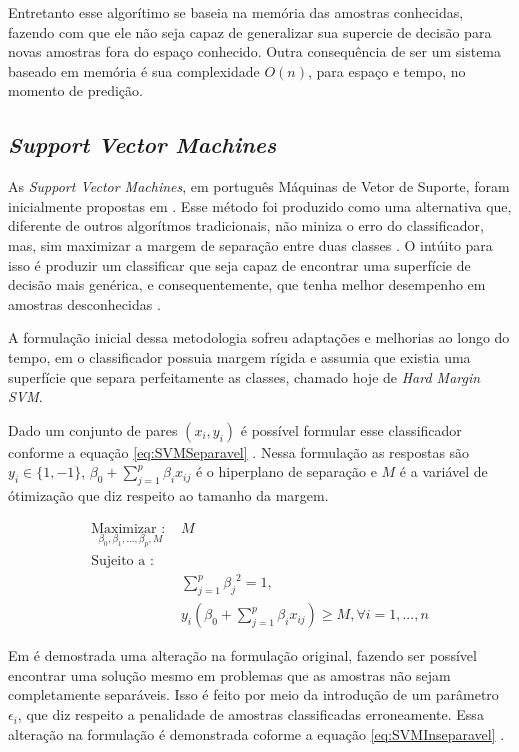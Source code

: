 Entretanto esse algorítimo se baseia na memória das amostras conhecidas, fazendo com que ele não seja capaz de generalizar sua supercie de decisão para novas amostras fora do espaço conhecido. Outra consequência de ser um sistema baseado em memória é sua complexidade $O(n)$, para espaço e tempo, no momento de predição. 


\subsection{\textit{Support Vector Machines}}
As \textit{Support Vector Machines}, em português Máquinas de Vetor de Suporte, foram inicialmente propostas em . Esse método foi produzido como uma alternativa que, diferente de outros algorítmos tradicionais, não miniza o erro do classificador, mas, sim maximizar a margem de separação entre duas classes \cite{James20131}. O intúito para isso é produzir um classificar que seja capaz de encontrar uma superfície de decisão mais genérica, e consequentemente, que tenha melhor desempenho em amostras desconhecidas \cite{Cortes1995}.

A formulação inicial dessa metodologia sofreu adaptações e melhorias ao longo do tempo, em  o classificador possuia margem rígida e assumia que existia uma superfície que separa perfeitamente as classes, chamado hoje de \textit{Hard Margin SVM}.

Dado um conjunto de pares $(x_i, y_i)$ é possível formular esse classificador conforme a equação \ref{eq:SVMSeparavel} \cite{James20131}. Nessa formulação as respostas são $y_i \in \{1, -1\}$, $\beta_0 + \sum_{j=1}^{p}{{\beta_i x_{ij}}}$ é o hiperplano de separação e $M$ é a variável de ótimização que diz respeito ao tamanho da margem. 

\begin{equation}
\begin{split}
\underset {\beta_0, \beta_1, ..., \beta_p, M}  {\text{Maximizar : }} &{M} \\
\text{Sujeito a : } \\
&\sum_{j=1}^{p}{{\beta_j}^2} = 1, \\
&y_i(\beta_0 + \sum_{j=1}^{p}{{\beta_i x_{ij}}}) \geq M, \forall i = 1, ..., n
\end{split}
\label{eq:SVMSeparavel}
\end{equation}

Em  é demostrada uma alteração na formulação original, fazendo ser possível encontrar uma solução mesmo em problemas que as amostras não sejam completamente separáveis. Isso é feito por meio da introdução de um parâmetro $\epsilon_i$, que diz respeito a penalidade de amostras classificadas erroneamente. Essa alteração na formulação é demonstrada coforme a equação \ref{eq:SVMInseparavel} \cite{James20131}.

